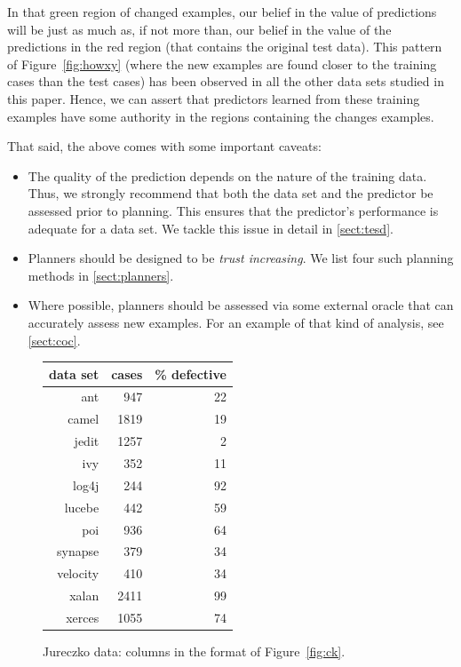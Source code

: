 \documentclass{sig-alternate}
\newcommand{\bi}{\begin{itemize}}
\newcommand{\ei}{\end{itemize}}
\newcommand{\tion}[1]{\textsection\ref{sect:#1}}
\newcommand{\fig}[1]{Figure~\ref{fig:#1}}
\begin{document}
In that green region of changed examples, our belief in the value of predictions
will be just as much as, if not more than, our belief in the value of the predictions in the red region (that
contains the original test data).
This pattern of \fig{howxy} (where the new examples are found closer to  the training cases than the test cases) has been observed in all the other data sets studied in this
paper. Hence,  we can assert that
predictors learned from these training examples have some authority in the regions
containing the changes examples.


That said, the above comes with some important caveats:
\bi
\item 
The quality of the prediction depends on the nature of the training data. Thus, we strongly recommend that both the data set and the predictor be assessed prior to planning. This ensures that the predictor's performance is adequate for a data set. We tackle this issue in detail in \tion{tesd}.
\item
Planners should be designed to be {\em trust increasing}. We list four such planning methods in \tion{planners}.
\item
Where possible, planners should be assessed via some external
oracle that can accurately assess new examples. For an example of that kind of analysis,
see  \tion{coc}.
\ei



  
 \begin{figure}[!t]
 \small
 \begin{center}
 \begin{tabular}{r|rr}
 data set & cases & \% defective\\\hline
  ant &947& 22\\
  camel& 1819& 19\\
 jedit& 1257& 2\\
 ivy &352& 11\\
 log4j& 244 &92\\
 lucebe &442 &59\\
 poi& 936 &64\\
 synapse &379 &34\\
 velocity& 410& 34\\
 xalan& 2411& 99\\
 xerces &1055& 74
 \end{tabular}
 \end{center}
 \caption{ Jureczko data: columns in the format of \fig{ck}.}\label{fig:jd}
 \end{figure}
 
\end{document}
